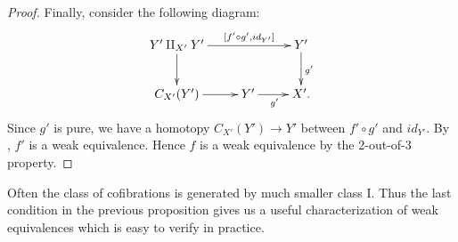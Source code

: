 \documentclass{amsart}
\makeatletter
\theoremstyle{definition}
\newcommand{\cat}[1]{\mathbf{#1}}
\newcommand{\C}{\cat{C}}
\newcommand{\I}{\mathrm{I}}
\newcommand{\cyli}{i}
\newcommand{\po}[1][dr]{\save*!/#1+1.2pc/#1:(1,-1)@^{|-}\restore}
\makeatother
\begin{document}
\begin{proof}
Finally, consider the following diagram:
\[ \xymatrix{ Y' \amalg_{X'} Y' \ar[rr]^-{[f' \circ g', id_{Y'}]} \ar[d] &                & Y' \ar[d]^{g'} \\
              C_{X'}(Y')        \ar[r]                                   & Y' \ar[r]_{g'} & X'.
            } \]
Since $g'$ is pure, we have a homotopy $C_{X'}(Y') \to Y'$ between $f' \circ g'$ and $id_{Y'}$.
By , $f'$ is a weak equivalence.
Hence $f$ is a weak equivalence by the 2-out-of-3 property.
\end{proof}

Often the class of cofibrations is generated by much smaller class $\I$.
Thus the last condition in the previous proposition gives us a useful characterization of weak equivalences which is easy to verify in practice.

\begin{comment}
Let $\C$ be a category and let $i : U \to V$ be a morphism of $\C$.
A \emph{system of cylinders} for $i$ consists of the following data:
a relative cylinder object $C_U(V)$, cylinder objects $C(U)$ and $C(V)$, and a morphism of cylinder objects $C(i) : C(U) \to C(V)$
which satisfy the following conditions:
\begin{enumerate}
\item \label{it:comp} For every $i : U \to V$ in $\I$, we have a lift in the following diagram:
\[ \xymatrix{ & V \amalg_U V \ar[r]^{[\cyli_0,\cyli_1]} \ar[d]_{\cyli_0 \amalg_{\cyli_0} \cyli_0} & C_U(V) \ar[d] \\
              V \amalg_U V \ar[r]^-{\cyli_1 \amalg_{\cyli_1} \cyli_1} \ar[d]_{[\cyli_1,\cyli_0]} & C(V) \amalg_{C(U)} C(V) \ar[r] & \po C(V) \amalg_{C(U)} C(V) \amalg_{V \amalg_U V} C_U(V) \\
              C_U(V) \ar@{-->}[urr]
            } \]
\item \label{it:hep-left} For every $u : U \to X$, $v : V \to X$ and homotopy $h : C(U) \to X$ between $u$ and $v \circ i$,
there exists a map $v' : V \to X$ and a homotopy $h' : C(V) \to X$ between $v'$ and $v$
such that $u = v' \circ i$ and $h' \circ C(i) = h$.
\item \label{it:hep-right} For every $u : U \to X$, $v : V \to X$ and homotopy $h : C(U) \to X$ between $v \circ i$ and $u$,
there exists a map $v' : V \to X$ and a homotopy $h' : C(V) \to X$ between $v$ and $v'$
such that $u = v' \circ i$ and $h' \circ C(i) = h$.
\end{enumerate}
The last two conditions are called \emph{the homotopy extension properties} of the system of cylinders.


\end{comment}
\end{document}
